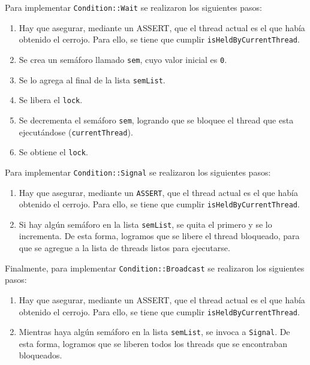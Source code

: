 Para implementar \texttt{Condition::Wait} se realizaron los siguientes pasos:
\begin{enumerate}
	\item Hay que asegurar, mediante un ASSERT, que el thread actual es el que había obtenido el cerrojo. Para ello, se tiene que cumplir \texttt{isHeldByCurrentThread}.
	\item Se crea un semáforo llamado \texttt{sem}, cuyo valor inicial es \texttt{0}.
	\item Se lo agrega al final de la lista \texttt{semList}.
	\item Se libera el \texttt{lock}.
	\item Se decrementa el semáforo \texttt{sem}, logrando que se bloquee el thread que esta ejecutándose (\texttt{currentThread}).
	\item Se obtiene el \texttt{lock}.
\end{enumerate}
Para implementar \texttt{Condition::Signal} se realizaron los siguientes pasos:
\begin{enumerate}
	\item Hay que asegurar, mediante un \texttt{ASSERT}, que el thread actual es el que había obtenido el cerrojo. Para ello, se tiene que cumplir \texttt{isHeldByCurrentThread}.
	\item Si hay algún semáforo en la lista \texttt{semList}, se quita el primero y se lo incrementa. De esta forma, logramos que se libere el thread bloqueado, para que se agregue a la lista de threads listos para ejecutarse.
\end{enumerate}
Finalmente, para implementar \texttt{Condition::Broadcast} se realizaron los siguientes pasos:
\begin{enumerate}
	\item Hay que asegurar, mediante un ASSERT, que el thread actual es el que había obtenido el cerrojo. Para ello, se tiene que cumplir \texttt{isHeldByCurrentThread}.
	\item Mientras haya algún semáforo en la lista \texttt{semList}, se invoca a \texttt{Signal}. De esta forma, logramos que se liberen todos los threads que se encontraban bloqueados.
\end{enumerate}
